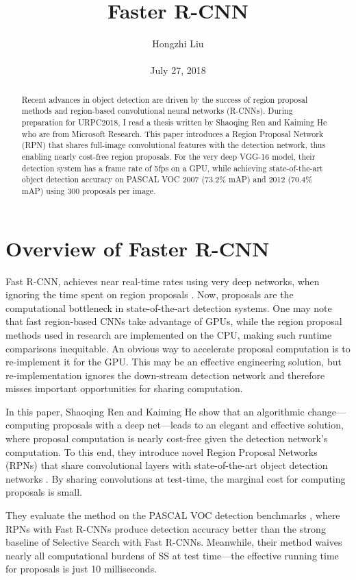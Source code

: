 \documentclass[10pt,twocolumn,letterpaper]{article}
\title{Faster R-CNN}
\author{Hongzhi Liu\\\\
July 27, 2018}
\begin{document}
\maketitle
\begin{abstract}
	Recent advances in object detection are driven by the success of region proposal methods and region-based convolutional neural networks (R-CNNs). During preparation for URPC2018, I read a thesis written by Shaoqing Ren and Kaiming He who are from Microsoft Research. This paper introduces a Region Proposal Network (RPN) that shares full-image convolutional features with the detection network, thus enabling nearly cost-free region proposals. For the very deep VGG-16 model, their detection system has a frame rate of 5fps on a GPU, while achieving state-of-the-art object detection accuracy on PASCAL VOC 2007 (73.2\% mAP) and 2012 (70.4\% mAP) using 300 proposals per image.
\end{abstract}

\section{Overview of Faster R-CNN}

Fast R-CNN, achieves near real-time rates using very deep networks, when ignoring the time spent on region proposals \cite{Girshick2015Fast}. Now, proposals are the computational bottleneck in state-of-the-art detection systems. One may note that fast region-based CNNs take advantage of GPUs, while the region proposal methods used in research are implemented on the CPU, making such runtime comparisons inequitable. An obvious way to accelerate proposal computation is to re-implement it for the GPU. This may be an effective engineering solution, but re-implementation ignores the down-stream detection network and therefore misses important opportunities for sharing computation.

In this paper, Shaoqing Ren and Kaiming He show that an algorithmic change—computing proposals with a deep net—leads to an elegant and effective solution, where proposal computation is nearly cost-free given the detection network’s computation. To this end, they introduce novel Region Proposal Networks (RPNs) that share convolutional layers with state-of-the-art object detection networks \cite{He2015Spatial, Girshick2015Fast}. By sharing convolutions at test-time, the marginal cost for computing proposals is small.

They evaluate the method on the PASCAL VOC detection benchmarks \cite{Everingham2005The}, where RPNs with Fast R-CNNs produce detection accuracy better than the strong baseline of Selective Search with Fast R-CNNs. Meanwhile, their method waives nearly all computational burdens of SS at test time—the effective running time for proposals is just 10 milliseconds.
\end{document}
